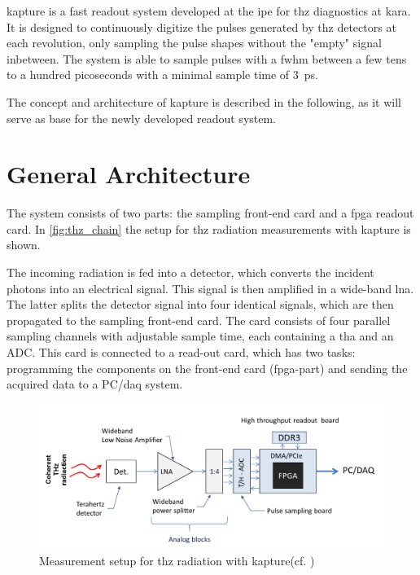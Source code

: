 \Gls{kapture} is a fast readout system developed at the \Gls{ipe} for \Gls{thz} diagnostics at \gls{kara}. It is designed to continuously digitize the pulses generated by \Gls{thz} detectors at each revolution, only sampling the pulse shapes without the "empty" signal inbetween. The system is able to sample pulses with a \gls{fwhm} between a few tens to a hundred picoseconds with a minimal sample time of \SI{3}{\pico \second}. \cite{caselleKAP}

The concept and architecture of \gls{kapture} is described in the following, as it will serve as base for the newly developed readout system. 

\section{General Architecture}
The system consists of two parts: the sampling front-end card and a \gls{fpga} readout card. In \autoref{fig:thz_chain} the setup for \gls{thz} radiation measurements with \gls{kapture} is shown. 

The incoming radiation is fed into a detector, which converts the incident photons into an electrical signal. This signal is then amplified in a wide-band \gls{lna}. The latter splits the detector signal into four identical signals, which are then propagated to the sampling front-end card. The card consists of four parallel sampling channels with adjustable sample time, each containing a \gls{tha} and an ADC. This card is connected to a read-out card, which has two tasks: programming the components on the front-end card (\gls{fpga}-part) and sending the acquired data to a PC/\gls{daq} system. \cite{caselle2014}

\begin{figure}[tbh]
	\centering
	\includegraphics[width = \textwidth]{chap/03-currentStat/img/thz_chain}
	\caption[THz measurement]{Measurement setup for \gls{thz} radiation with \gls{kapture}(cf. \cite{caselle2014})}
	\label{fig:thz_chain}
\end{figure}


